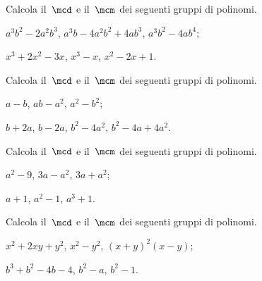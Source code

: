 \begin{esercizio}[\Ast]
\label{ese:13.88}
Calcola il~$\mcd$ e il~$\mcm$ dei seguenti gruppi di polinomi.
\begin{enumeratea}
 \item $a^{3}b^{2}-2a^{2}b^{3}$, $a^{3}b-4a^{2}b^{2}+4ab^{3}$, $a^{3}b^{2}-4ab^{4}$;
 \item $x^{3}+2x^{2}-3x$, $x^{3}-x$, $x^{2}-2x+1$.
\end{enumeratea}
\end{esercizio}

\begin{esercizio}[\Ast]
\label{ese:13.89}
Calcola il~$\mcd$ e il~$\mcm$ dei seguenti gruppi di polinomi.
\begin{multicols}{2}
\begin{enumeratea}
 \item $a-b$, $ab-a^{2}$, $a^{2}-b^{2}$;
 \item $b+2a$, $b-2a$, $b^{2}-4a^{2}$, $b^{2}-4a+4a^{2}$.
\end{enumeratea}
\end{multicols}
\end{esercizio}

\begin{esercizio}[\Ast]
\label{ese:13.90}
Calcola il~$\mcd$ e il~$\mcm$ dei seguenti gruppi di polinomi.
\begin{multicols}{2}
\begin{enumeratea}
 \item $a^{2}-9$, $3a-a^{2}$, $3a+a^{2}$;
 \item $a+1$, $a^{2}-1$, $a^{3}+1$.
\end{enumeratea}
\end{multicols}
\end{esercizio}

\begin{esercizio}[\Ast]
\label{ese:13.91}
Calcola il~$\mcd$ e il~$\mcm$ dei seguenti gruppi di polinomi.
\begin{multicols}{2}
\begin{enumeratea}
 \item $x^{2}+2xy+y^{2}$, $x^{2}-y^{2}$, $(x+y)^{2}(x-y)$;
 \item $b^{3}+b^{2}-4b-4$, $b^{2}-a$, $b^{2}-1$.
\end{enumeratea}
\end{multicols}
\end{esercizio}

